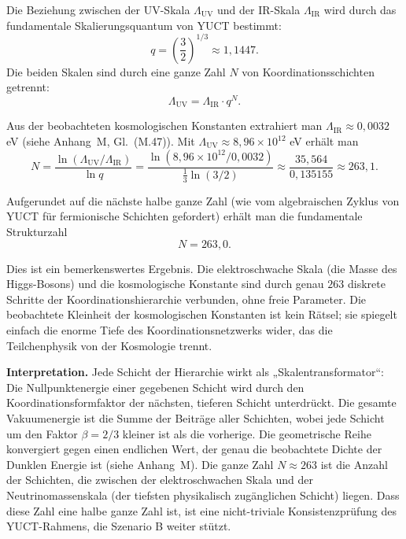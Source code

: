 \documentclass[11pt,a4paper]{article}
\newcommand{\LUV}{\Lambda_{\mathrm{UV}}}
\theoremstyle{remark}
\begin{document}
	Die Beziehung zwischen der UV-Skala \(\LUV\) und der IR-Skala \(\Lambda_{\mathrm{IR}}\) wird durch das fundamentale Skalierungsquantum von YUCT bestimmt:
	\begin{equation}
		q = \left(\frac{3}{2}\right)^{1/3} \approx 1,1447.
	\end{equation}
	Die beiden Skalen sind durch eine ganze Zahl \(N\) von Koordinationsschichten getrennt:
	\begin{equation}
		\LUV = \Lambda_{\mathrm{IR}} \cdot q^{N}.
		\label{eq:bridge}
	\end{equation}
	
	Aus der beobachteten kosmologischen Konstanten extrahiert man \(\Lambda_{\mathrm{IR}} \approx 0,0032\) eV (siehe Anhang~M, Gl.~(M.47)). Mit \(\LUV \approx 8,96 \times 10^{12}\) eV erhält man
	\begin{equation}
		N = \frac{\ln(\LUV / \Lambda_{\mathrm{IR}})}{\ln q}
		= \frac{\ln(8,96 \times 10^{12} / 0,0032)}{\frac{1}{3}\ln(3/2)}
		\approx \frac{35,564}{0,135155} \approx 263,1.
		\label{eq:N_layers}
	\end{equation}
	
	Aufgerundet auf die nächste halbe ganze Zahl (wie vom algebraischen Zyklus von YUCT für fermionische Schichten gefordert) erhält man die fundamentale Strukturzahl
	\begin{equation}
		\boxed{N = 263,0}.
	\end{equation}
	
	Dies ist ein bemerkenswertes Ergebnis. Die elektroschwache Skala (die Masse des Higgs-Bosons) und die kosmologische Konstante sind durch genau \(263\) diskrete Schritte der Koordinationshierarchie verbunden, ohne freie Parameter. Die beobachtete Kleinheit der kosmologischen Konstanten ist kein Rätsel; sie spiegelt einfach die enorme Tiefe des Koordinationsnetzwerks wider, das die Teilchenphysik von der Kosmologie trennt.
	
	\textbf{Interpretation.} Jede Schicht der Hierarchie wirkt als „Skalentransformator“: Die Nullpunktenergie einer gegebenen Schicht wird durch den Koordinationsformfaktor der nächsten, tieferen Schicht unterdrückt. Die gesamte Vakuumenergie ist die Summe der Beiträge aller Schichten, wobei jede Schicht um den Faktor \(\beta = 2/3\) kleiner ist als die vorherige. Die geometrische Reihe konvergiert gegen einen endlichen Wert, der genau die beobachtete Dichte der Dunklen Energie ist (siehe Anhang~M). Die ganze Zahl \(N \approx 263\) ist die Anzahl der Schichten, die zwischen der elektroschwachen Skala und der Neutrinomassenskala (der tiefsten physikalisch zugänglichen Schicht) liegen. Dass diese Zahl eine halbe ganze Zahl ist, ist eine nicht-triviale Konsistenzprüfung des YUCT-Rahmens, die Szenario B weiter stützt.
	
\end{document}
